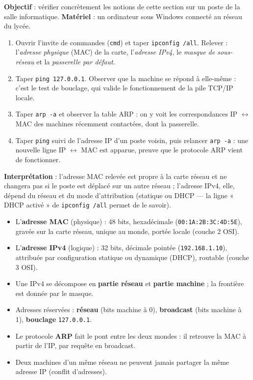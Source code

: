 \documentclass[11pt]{article}
\begin{document}
\begin{experience}
\textbf{Objectif} : vérifier concrètement les notions de cette section sur un poste de la salle informatique.
\textbf{Matériel} : un ordinateur sous Windows connecté au réseau du lycée.
\begin{enumerate}
  \item Ouvrir l'invite de commandes (\texttt{cmd}) et taper \texttt{ipconfig /all}. Relever : l'\emph{adresse physique} (MAC) de la carte, l'\emph{adresse IPv4}, le \emph{masque de sous-réseau} et la \emph{passerelle par défaut}.
  \item Taper \texttt{ping 127.0.0.1}. Observer que la machine se répond à elle-même : c'est le test de bouclage, qui valide le fonctionnement de la pile TCP/IP locale.
  \item Taper \texttt{arp -a} et observer la table ARP : on y voit les correspondances IP $\leftrightarrow$ MAC des machines récemment contactées, dont la passerelle.
  \item Taper \texttt{ping} suivi de l'adresse IP d'un poste voisin, puis relancer \texttt{arp -a} : une nouvelle ligne IP $\leftrightarrow$ MAC est apparue, preuve que le protocole ARP vient de fonctionner.
\end{enumerate}
\textbf{Interprétation} : l'adresse MAC relevée est propre à la carte réseau et ne changera pas si le poste est déplacé sur un autre réseau ; l'adresse IPv4, elle, dépend du réseau et du mode d'attribution (statique ou DHCP — la ligne « DHCP activé » de \texttt{ipconfig /all} permet de le savoir).
\end{experience}

\begin{aretenir}
\begin{itemize}
  \item L'\textbf{adresse MAC} (physique) : 48 bits, hexadécimale (\texttt{00:1A:2B:3C:4D:5E}), gravée sur la carte réseau, unique au monde, portée locale (couche 2 OSI).
  \item L'\textbf{adresse IPv4} (logique) : 32 bits, décimale pointée (\texttt{192.168.1.10}), attribuée par configuration statique ou dynamique (DHCP), routable (couche 3 OSI).
  \item Une IPv4 se décompose en \textbf{partie réseau} et \textbf{partie machine} ; la frontière est donnée par le masque.
  \item Adresses réservées : \textbf{réseau} (bits machine à 0), \textbf{broadcast} (bits machine à 1), \textbf{bouclage} \texttt{127.0.0.1}.
  \item Le protocole \textbf{ARP} fait le pont entre les deux mondes : il retrouve la MAC à partir de l'IP, par requête en broadcast.
  \item Deux machines d'un même réseau ne peuvent jamais partager la même adresse IP (conflit d'adresses).
\end{itemize}
\end{aretenir}
\end{document}
